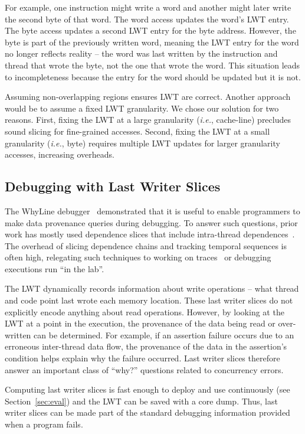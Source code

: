 \documentclass[preprint,9pt]{sigplanconf}
\newcommand{\lwt}{LWT\xspace}
\begin{document}
For example, one instruction might write a word and another might later write
the second byte of that word.  The word access updates the word's \lwt entry.
The byte access updates a second \lwt entry for the byte address.  However, the
byte is part of the previously written word, meaning the \lwt entry for the
word no longer reflects reality -- the word was last written by the instruction
and thread that wrote the byte, not the one that wrote the word.  This
situation leads to incompleteness because the entry for the word should be
updated but it is not.

Assuming non-overlapping regions ensures \lwt are correct.  Another
approach would be to assume a fixed \lwt granularity.  We chose our solution
for two reasons.  First, fixing the \lwt at a large granularity ({\em i.e.},
cache-line) precludes sound slicing for fine-grained accesses.  Second, fixing
the \lwt at a small granularity ({\em i.e.}, byte) requires multiple \lwt
updates for larger granularity accesses, increasing overheads.




\subsection{Debugging with Last Writer Slices}
\label{sec:debugging}
The WhyLine debugger~\cite{whylineicse} demonstrated that it is useful to
enable programmers to make data provenance queries during debugging.  To answer
such questions, prior work has mostly used dependence slices that include
intra-thread dependences~\cite{whylineicse,conseq,tipslicingsurvey}.  The
overhead of slicing dependence chains and tracking temporal sequences is often
high, relegating such techniques to working on traces~\cite{whylinechi} or
debugging executions run ``in the lab''.  

The \lwt dynamically records information about write operations -- what thread
and code point last wrote each memory location.   These last writer slices do
not explicitly encode anything about read operations.  However, by looking at
the \lwt at a point in the execution, the provenance of the data being read or
over-written can be determined.  For example, if an assertion failure occurs
due to an erroneous inter-thread data flow, the provenance of the data in the
assertion's condition helps explain why the failure occurred.  Last writer
slices therefore answer an important class of ``why?'' questions related to
concurrency errors.     

Computing last writer slices is fast enough to deploy and use continuously (see
Section~\ref{sec:eval}) and the \lwt can be saved with a core dump.  Thus, last
writer slices can be made part of the standard debugging information provided
when a program fails.  
\end{document}
